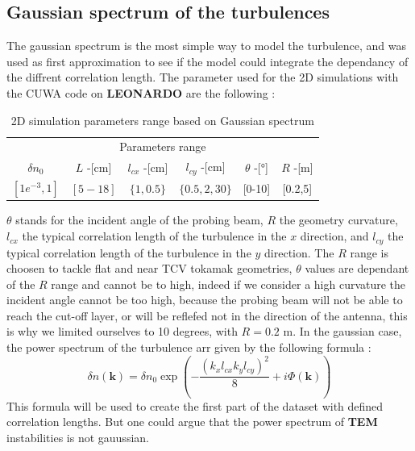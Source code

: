 \documentclass[11pt,a4paper,openany]{report}
\begin{document}
\begin{multicols}{2}
    \subsection{Gaussian spectrum of the turbulences}
    The gaussian spectrum is the most simple way to model the turbulence, and was used as first approximation to see if the model could integrate the dependancy of the diffrent correlation length. The parameter used for the 2D simulations with the CUWA code on \textbf{LEONARDO} are the following :
    \setlength{\tabcolsep}{.008\linewidth}
    \begin{table}
        \begin{tabular}{c|c|c|c|c|c}
            \toprule
            \multicolumn{6}{c}{Parameters range}                                                     \\
            \cmidrule{1 -6}
            $\delta n_0$   & $L$ -[cm] & $l_{cx}$ -[cm] & $l_{cy}$ -[cm]  & $\theta$ -[°] & $R$ -[m] \\
            \midrule
            $[1e^{-3}, 1]$ & $[5-18]$  & $\{1, 0.5 \}$  & $\{0.5,2,30 \}$ & [0-10]        & [0.2,5]  \\
            \bottomrule
        \end{tabular}
        \caption{2D simulation parameters range based on Gaussian spectrum}
        \label{Gaussian_table}
    \end{table}
    $\theta$ stands for the incident angle of the probing beam, $R$ the geometry curvature, $l_{cx}$ the typical correlation length of the turbulence in the $x$ direction, and $l_{cy}$ the typical correlation length of the turbulence in the $y$ direction. The $R$ range is choosen to tackle flat and near TCV tokamak geometries, $\theta$ values are dependant of the $R$ range and cannot be to high, indeed if we consider a high curvature the incident angle cannot be too high, because the probing beam will not be able to reach the cut-off layer, or will be reflefed not in the direction of the antenna, this is why we limited ourselves to 10 degrees, with $R = 0.2$ m. In the gaussian case, the power spectrum of the turbulence arr given by the following formula :
    $$\delta n(\textbf{k} ) = \delta n_0 \exp\left(-\frac{(k_x l_{cx} k_y l_{cy})^2}{8} + i\Phi(\textbf{k} )\right)$$
    This formula will be used to create the first part of the dataset with defined correlation lengths. But one could argue that the power spectrum of \textbf{TEM} instabilities is not gauussian.

\end{multicols}
\end{document}

